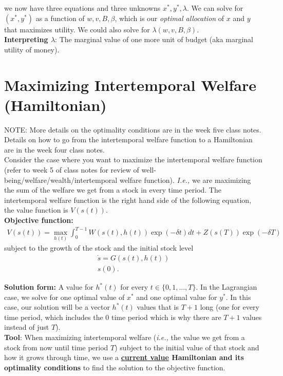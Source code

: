 \documentclass{article}
\begin{document}
we now have three equations and three unknowns $x^*, y^*, \lambda$. We can solve for $(x^*, y^*)$ as a function of $w,v,B, \beta$, which is our \textit{optimal allocation} of $x$ and $y$ that maximizes utility. We could also solve for $\lambda(w,v,B, \beta)$. \\

\textbf{Interpreting $\lambda$}: The marginal value of one more unit of budget (aka marginal utility of money). 

\section{Maximizing Intertemporal Welfare (Hamiltonian)}
NOTE: More details on the optimality conditions are in the week five class notes. Details on how to go from the intertemporal welfare function to a Hamiltonian are in the week four class notes.\\

Consider the case where you want to maximize the intertemporal welfare function (refer to week 5 of class notes for review of well-being/welfare/wealth/intertemporal welfare function). \textit{I.e.,} we are maximizing the sum of the welfare we get from a stock in every time period. The intertemporal welfare function is the right hand side of the following equation, the value function is $V(s(t))$. \\

\textbf{Objective function:}
\begin{align}
    V(s(t)) = \max_{h(t)} \int_0^{T-1} W(s(t), h(t))\exp(-\delta t) dt + Z(s(T)) \exp(-\delta T)
\end{align}
subject to the growth of the stock and the initial stock level 
\begin{align}
    \dot s = G(s(t), h(t))\\
    s(0).
\end{align}

\textbf{Solution form:} A value for $h^*(t)$ for every $ t \in \{0, 1, ..., T\}$. In the Lagrangian case, we solve for one optimal value of $x^*$ and one optimal value for $y^*$. In this case, our solution will be a vector $h^*(t)$ values that is $T+1$ long (one for every time period, which includes the 0 time period which is why there are $T+1$ values instead of just $T$).\\

\textbf{Tool}: When maximizing intertemporal welfare (\textit{i.e.,} the value we get from a stock from now until time period $T$) subject to the initial value of that stock and how it grows through time, we use a \textbf{\underline{current value} Hamiltonian and its optimality conditions} to find the solution to the objective function. \\
\end{document}
